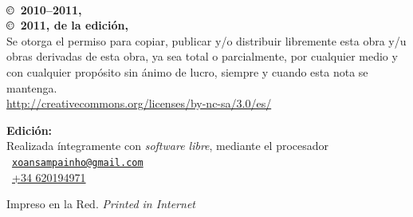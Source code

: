 \noindent
\textbf{\titlename}\\
\authorname

\footnotesize

\bigskip\bigskip\noindent
\textbf{\copyright\ 2010--2011, \authorname}\\
\textbf{\copyright\ 2011, de la edición, \editorname}\\
Se otorga el permiso para copiar, publicar y/o distribuir libremente esta obra y/u obras derivadas de esta obra, ya sea total o parcialmente, por cualquier medio y con cualquier propósito sin ánimo de lucro, siempre y cuando esta nota se mantenga.\\
{\selectfont\url{http://creativecommons.org/licenses/by-nc-sa/3.0/es/}}

\normalsize

\noindent\ccbyncsaeu

\footnotesize

\bigskip\noindent
\textbf{Edición:} \editorname\\
Realizada íntegramente con \emph{software libre}, mediante el procesador \LaTeXe\\
\Letter\ {\selectfont\href{mailto:xoansampainho@gmail.com}{\nolinkurl{xoansampainho@gmail.com}}}\\
\Telefon\ \href{callto:+34620194971}{+34 620194971}

\bigskip\noindent
Impreso en la Red. \emph{Printed in Internet}

\normalsize

\endinput
